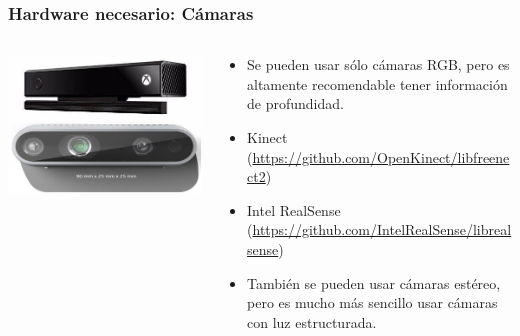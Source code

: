 \documentclass[10pt,spanish,aspectratio=1610]{beamer}
\begin{document}
\begin{frame}\frametitle{Hardware necesario: Cámaras}
  \begin{columns}
    \begin{column}{0.45\textwidth}
      \includegraphics[width=\textwidth]{Figures/Cameras.jpg}
    \end{column}
    \begin{column}{0.5\textwidth}
      \begin{itemize}
      \item Se pueden usar sólo cámaras RGB, pero es altamente recomendable tener información de profundidad.
      \item Kinect (\url{https://github.com/OpenKinect/libfreenect2})
      \item Intel RealSense (\url{https://github.com/IntelRealSense/librealsense})
      \item También se pueden usar cámaras estéreo, pero es mucho más sencillo usar cámaras con luz estructurada.
      \end{itemize}
    \end{column}
  \end{columns}
\end{frame}
\end{document}
